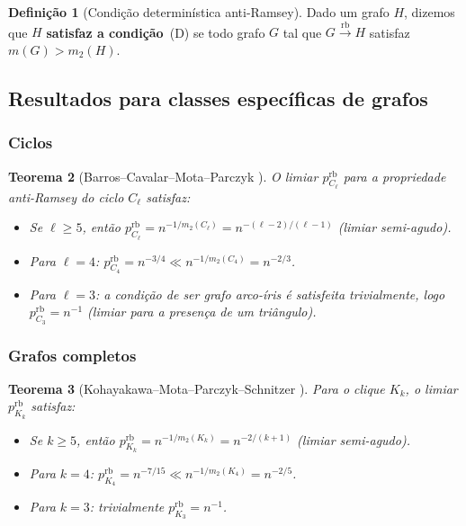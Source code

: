 \documentclass[reqno, 12pt]{amsart}
\numberwithin{equation}{section}
\theoremstyle{plain}
\newtheorem{theorem}{Teorema}[section]
\theoremstyle{definition}
\newtheorem{definition}[theorem]{Definição}
\newcommand{\rb}{\xrightarrow{\,\mathrm{rb}\,}}
\newcommand{\mdens}{m_2}
\newcommand{\maxdens}{m}
\begin{document}
\begin{definition}[Condição determinística anti-Ramsey]
\label{def:cond-det}
Dado um grafo $H$, dizemos que $H$ \textbf{satisfaz a condição}~(D)
se todo grafo $G$ tal que $G \rb H$ satisfaz $\maxdens(G) > \mdens(H)$.
\end{definition}

\subsection{Resultados para classes específicas de grafos}

\subsubsection*{Ciclos}

\begin{theorem}[Barros--Cavalar--Mota--Parczyk \cite{AntiCycles}]
\label{thm:anticycles}
O limiar $p_{C_\ell}^{\mathrm{rb}}$ para a propriedade anti-Ramsey do ciclo $C_\ell$
satisfaz:
\begin{itemize}
  \item Se $\ell \ge 5$, então
    $p_{C_\ell}^{\mathrm{rb}} = n^{-1/\mdens(C_\ell)} = n^{-(\ell-2)/(\ell-1)}$
    (limiar semi-agudo).
  \item Para $\ell = 4$:
    $p_{C_4}^{\mathrm{rb}} = n^{-3/4} \ll n^{-1/\mdens(C_4)} = n^{-2/3}$.
  \item Para $\ell = 3$: a condição de ser grafo arco-íris é satisfeita
    trivialmente, logo
    $p_{C_3}^{\mathrm{rb}} = n^{-1}$ (limiar para a presença de um triângulo).
\end{itemize}
\end{theorem}

\subsubsection*{Grafos completos}

\begin{theorem}[Kohayakawa--Mota--Parczyk--Schnitzer \cite{AntiComplete}]
\label{thm:anticomplete}
Para o clique $K_k$, o limiar $p_{K_k}^{\mathrm{rb}}$ satisfaz:
\begin{itemize}
  \item Se $k \ge 5$, então
    $p_{K_k}^{\mathrm{rb}} = n^{-1/\mdens(K_k)} = n^{-2/(k+1)}$
    (limiar semi-agudo).
  \item Para $k = 4$:
    $p_{K_4}^{\mathrm{rb}} = n^{-7/15} \ll n^{-1/\mdens(K_4)} = n^{-2/5}$.
  \item Para $k = 3$: trivialmente $p_{K_3}^{\mathrm{rb}} = n^{-1}$.
\end{itemize}
\end{theorem}
\end{document}
